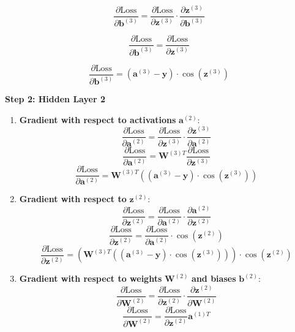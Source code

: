 \documentclass{ioereport}
\begin{document}
\begin{enumerate}[label=\textbf{\roman*.}]
  \[
  \frac{\partial \text{Loss}}{\partial \mathbf{b}^{(3)}} = \frac{\partial \text{Loss}}{\partial \mathbf{z}^{(3)}} \cdot \frac{\partial \mathbf{z}^{(3)}}{\partial \mathbf{b}^{(3)}}
  \]

  \[
  \frac{\partial \text{Loss}}{\partial \mathbf{b}^{(3)}} = \frac{\partial \text{Loss}}{\partial \mathbf{z}^{(3)}}
  \]

  \begin{equation}
  \frac{\partial \text{Loss}}{\partial \mathbf{b}^{(3)}} = (\mathbf{a}^{(3)} - \mathbf{y}) \cdot \cos(\mathbf{z}^{(3)})
  \end{equation}
  
\end{enumerate}

\textbf{Step 2: Hidden Layer 2}
\begin{enumerate}[label=\textbf{\roman*.}]
  \item \textbf{Gradient with respect to activations} $\mathbf{a}^{(2)}$:
    \[
  \frac{\partial \text{Loss}}{\partial \mathbf{a}^{(2)}} = \frac{\partial \text{Loss}}{\partial \mathbf{z}^{(3)}} \cdot \frac{\partial \mathbf{z}^{(3)}}{\partial \mathbf{a}^{(2)}}
  \]
  \[
  \frac{\partial \text{Loss}}{\partial \mathbf{a}^{(2)}} = \mathbf{W}^{(3)T} \frac{\partial \text{Loss}}{\partial \mathbf{z}^{(3)}}
  \]
  \begin{equation}
  \frac{\partial \text{Loss}}{\partial \mathbf{a}^{(2)}} = \mathbf{W}^{(3)T} \left((\mathbf{a}^{(3)} - \mathbf{y}) \cdot \cos(\mathbf{z}^{(3)})\right)
  \end{equation}
  \item \textbf{Gradient with respect to} $\mathbf{z}^{(2)}$:
    \[
  \frac{\partial \text{Loss}}{\partial \mathbf{z}^{(2)}} = \frac{\partial \text{Loss}}{\partial \mathbf{a}^{(2)}} \cdot \frac{\partial \mathbf{a}^{(2)}}{\partial \mathbf{z}^{(2)}}
  \]
  \[
  \frac{\partial \text{Loss}}{\partial \mathbf{z}^{(2)}} = \frac{\partial \text{Loss}}{\partial \mathbf{a}^{(2)}} \cdot \cos(\mathbf{z}^{(2)})
  \]
  \begin{equation}
  \frac{\partial \text{Loss}}{\partial \mathbf{z}^{(2)}} = \left(\mathbf{W}^{(3)T} \left((\mathbf{a}^{(3)} - \mathbf{y}) \cdot \cos(\mathbf{z}^{(3)})\right)\right) \cdot \cos(\mathbf{z}^{(2)})
  \end{equation}

  \item \textbf{Gradient with respect to weights} $\mathbf{W}^{(2)}$ \textbf{and biases} $\mathbf{b}^{(2)}$:
  \[
  \frac{\partial \text{Loss}}{\partial \mathbf{W}^{(2)}} = \frac{\partial \text{Loss}}{\partial \mathbf{z}^{(2)}} \cdot \frac{\partial \mathbf{z}^{(2)}}{\partial \mathbf{W}^{(2)}}
  \]
  \[
  \frac{\partial \text{Loss}}{\partial \mathbf{W}^{(2)}} = \frac{\partial \text{Loss}}{\partial \mathbf{z}^{(2)}} \mathbf{a}^{(1)T}
  \]


\end{enumerate}
\end{document}
